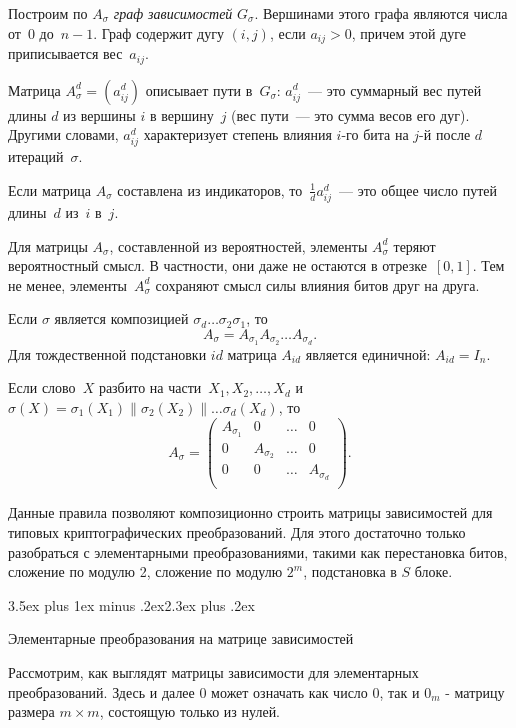 \documentclass[a4paper,12pt]{report}
\makeatletter
\theoremstyle{plain} %
\theoremstyle{definition}
\theoremstyle{remark}
\renewcommand{\section}{\@startsection{section}{1}{18pt}%
{3.5ex plus 1ex minus .2ex}{2.3ex plus .2ex}%
{\normalfont\Large\bfseries\raggedright}}%
\makeatother
\begin{document}
\begin{large}
Построим по $A_\sigma$ {\it граф зависимостей} $G_\sigma$.
Вершинами этого графа являются числа от~$0$ до~$n-1$.
Граф содержит дугу $(i,j)$, если $a_{ij}>0$,
причем этой дуге приписывается вес~$a_{ij}$.

Матрица $A_\sigma^d=(a_{ij}^d)$ описывает пути в~$G_\sigma$:
$a_{ij}^d$~--- это суммарный вес путей длины $d$ из вершины $i$
в вершину~$j$ (вес пути~--- это сумма весов его дуг).
Другими словами, $a_{ij}^d$ характеризует степень влияния 
$i$-го бита на $j$-й после $d$ итераций~$\sigma$.

Если матрица $A_\sigma$ составлена из индикаторов,
то~$\frac{1}{d}a_{ij}^d$~--- это общее число путей длины~$d$
из~$i$ в~$j$.

Для матрицы $A_\sigma$, составленной из вероятностей,
элементы $A_\sigma^d$ теряют вероятностный смысл.
В частности, они даже не остаются в отрезке~$[0,1]$.
%
Тем не менее, элементы~$A_\sigma^d$ сохраняют смысл силы 
влияния битов друг на друга.

Если $\sigma$ является композицией $\sigma_d\ldots\sigma_2\sigma_1$,
то
$$
A_\sigma=A_{\sigma_1}A_{\sigma_2}\ldots A_{\sigma_d}.
$$
Для тождественной подстановки $id$ матрица $A_{id}$
является единичной: $A_{id}=I_n$.

Если слово~$X$ разбито на части~$X_1,X_2,\ldots,X_d$ 
и~$\sigma(X)=\sigma_1(X_1)\parallel\sigma_2(X_2)\parallel\ldots\sigma_d(X_d)$,
то
$$
A_\sigma=
\begin{pmatrix}
A_{\sigma_1} & 0 & \ldots & 0\\
0 & A_{\sigma_2} & \ldots & 0\\
0 &   0          & \ldots & A_{\sigma_d}\\
\end{pmatrix}.
$$

Данные правила позволяют композиционно строить матрицы 
зависимостей для типовых криптографических преобразований.
Для этого достаточно только разобраться с элементарными преобразованиями, такими как перестановка битов, сложение по модулю 2, сложение по модулю $2^m$, подстановка в $S$ блоке.

\section{Элементарные преобразования на матрице зависимостей}

Рассмотрим, как выглядят матрицы зависимости для элементарных преобразований. Здесь и далее 0 может означать как число 0, так и $0_m$ - матрицу размера $m \times m$, состоящую только из нулей.



\end{large}
\end{document}
